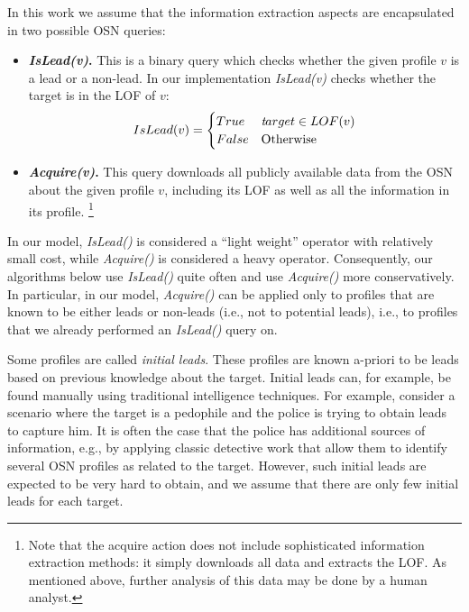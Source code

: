 \documentclass[journal]{IEEEtran}
\newcommand{\islead}[1]{{\em IsLead(#1)}}
\newcommand{\acquire}[1]{{\em Acquire(#1)}}
\newcommand{\target}{{\textit target}}
\begin{document}


In this work we assume that the information extraction aspects are encapsulated in two possible OSN queries: 
\begin{itemize}
\item {\bf \islead{v}.} This is a binary query which checks whether the given profile \(v\) is a lead or a non-lead. In our implementation \islead{v}  checks whether the target is in the LOF of $v$:
\begin{equation}
IsLead(v)=
\begin{cases} 
      True  & \target \in LOF(v) \\
      False & \text{Otherwise}
\end{cases}
\end{equation}
\item {\bf \acquire{v}.}  This query downloads all publicly available data from the OSN about the given profile \(v\), including its LOF as well as all the information in its profile.
\footnote{Note that the acquire action does not include sophisticated information extraction methods: it simply downloads all data and extracts the LOF. As mentioned above, further analysis of this data may be done by a human analyst.}
\end{itemize}

In our model, \islead{} is considered a ``light weight'' operator with relatively small cost, while \acquire{} is considered a heavy operator. 
Consequently, our algorithms below use \islead{} 
quite often and use \acquire{} more conservatively. In particular, in our model, \acquire{} can be applied only to profiles that are known to be either leads or non-leads (i.e., not to potential leads), i.e., to profiles that we already performed an \islead{} query on. 


Some profiles are called {\em initial leads}. These profiles are known a-priori to be leads based on previous knowledge about the target.  Initial leads can, for example, be found manually using traditional intelligence techniques. 
For example, consider a scenario where the target is a pedophile and the police is trying to obtain leads to capture him. It is often the case that the police has additional sources of information, e.g., by applying classic detective work that allow them to identify several OSN profiles as related to the target. However, such initial leads are expected to be very hard to obtain, and we assume that there are only few initial leads for each target. 
\end{document}
